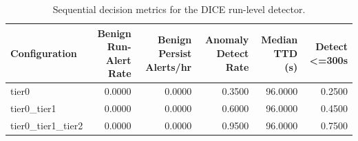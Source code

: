 \begin{table}[t]
\centering
\caption{Sequential decision metrics for the DICE run-level detector.}
\label{tab:dice_sequential_metrics}
\footnotesize
\begin{tabular}{lrrrrr}
\toprule
Configuration & Benign Run-Alert Rate & Benign Persist Alerts/hr & Anomaly Detect Rate & Median TTD (s) & Detect <=300s \\
\midrule
tier0 & 0.0000 & 0.0000 & 0.3500 & 96.0000 & 0.2500 \\
tier0_tier1 & 0.0000 & 0.0000 & 0.6000 & 96.0000 & 0.4500 \\
tier0_tier1_tier2 & 0.0000 & 0.0000 & 0.9500 & 96.0000 & 0.7500 \\
\bottomrule
\end{tabular}

\end{table}
